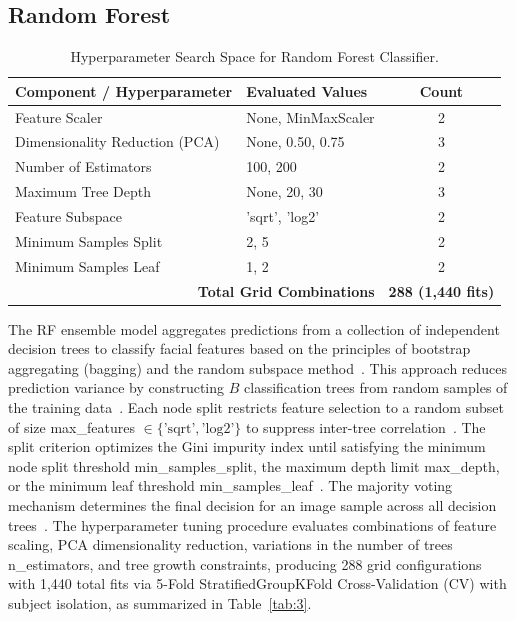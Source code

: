 \subsection{Random Forest}
\label{sec:random_forest}

\begin{table}[htbp]
\caption{Hyperparameter Search Space for Random Forest Classifier.}
\label{tab:3}
\label{tab:III}
\label{tab:rf_params}
\centering
\footnotesize
\begin{tabular}{llc}
\toprule
Component / Hyperparameter & Evaluated Values & Count \\
\midrule
Feature Scaler & None, MinMaxScaler & 2 \\
Dimensionality Reduction (PCA) & None, 0.50, 0.75 & 3 \\
Number of Estimators & 100, 200 & 2 \\
Maximum Tree Depth & None, 20, 30 & 3 \\
Feature Subspace & 'sqrt', 'log2' & 2 \\
Minimum Samples Split & 2, 5 & 2 \\
Minimum Samples Leaf & 1, 2 & 2 \\
\midrule
\multicolumn{2}{r}{\textbf{Total Grid Combinations}} & \textbf{288 (1,440 fits)} \\
\bottomrule
\end{tabular}
\end{table}

The RF ensemble model aggregates predictions from a collection of independent decision trees to classify facial features based on the principles of bootstrap aggregating (bagging) and the random subspace method~\cite{ref30}. This approach reduces prediction variance by constructing $B$ classification trees from random samples of the training data~\cite{ref31}. Each node split restricts feature selection to a random subset of size max\_features $\in \{\text{'sqrt'}, \text{'log2'}\}$ to suppress inter-tree correlation~\cite{ref32}. The split criterion optimizes the Gini impurity index until satisfying the minimum node split threshold min\_samples\_split, the maximum depth limit max\_depth, or the minimum leaf threshold min\_samples\_leaf~\cite{ref33}. The majority voting mechanism determines the final decision for an image sample across all decision trees~\cite{ref34}. The hyperparameter tuning procedure evaluates combinations of feature scaling, PCA dimensionality reduction, variations in the number of trees n\_estimators, and tree growth constraints, producing 288 grid configurations with 1,440 total fits via 5-Fold StratifiedGroupKFold Cross-Validation (CV) with subject isolation, as summarized in Table~\ref{tab:3}.
